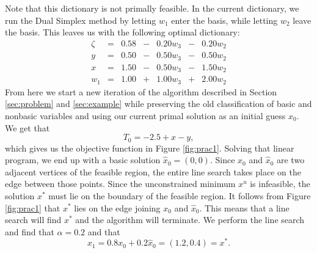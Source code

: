 Note that this dictionary is not primally feasible. 
In the current dictionary, we run the Dual Simplex method by letting $w_1$
enter the basis, while letting $w_2$ leave the basis.
This leaves us with the following optimal dictionary:
\[
    \begin{array}{rcrcrcr}
        \zeta &=& 0.58 &-& 0.20 w_3 &-& 0.20 w_2 \\ \hline
            y &=& 0.50 &-& 0.50 w_3 &-& 0.50 w_2 \\
            x &=& 1.50 &-& 0.50 w_3 &-& 1.50 w_2 \\
          w_1 &=& 1.00 &+& 1.00 w_3 &+& 2.00 w_2
    \end{array}
\]
From here we start a new iteration of the algorithm described in Section
\ref{sec:problem} and \ref{sec:example} while preserving the old classification
of basic and nonbasic variables and using our current primal solution as an
initial guess $x_0$. We get that
\[
    T_0 = -2.5 + x - y,
\]
which gives us the objective function in Figure \ref{fig:prac1}. Solving that
linear program, we end up with a basic solution $\hat{x}_0 = (0,0)$.
Since $x_0$ and $\hat{x}_0$ are two adjacent vertices of the feasible region,
the entire line search takes place on the edge between those points.
Since the unconstrained minimum $x^u$ is infeasible, the solution $x^*$ must
lie on the boundary of the feasible region.
It follows from Figure \ref{fig:prac1} that $x^*$ lies on the edge joining 
$x_0$ and $\hat{x}_0$.
This means that a line search will find $x^*$ and the algorithm will terminate.
We perform the line search and find that $\alpha = 0.2$ and that
\[
    x_1 = 0.8 x_0 + 0.2 \hat{x}_0 = (1.2, 0.4) = x^*.
\]
